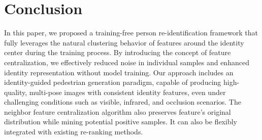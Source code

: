 \section{Conclusion}
In this paper, we proposed a training-free person re-identification framework that fully leverages the natural clustering behavior of features around the identity center during the training process. By introducing the concept of feature centralization, we effectively reduced noise in individual samples and enhanced identity representation without model training. Our approach includes an identity-guided pedestrian generation paradigm, capable of producing high-quality, multi-pose images with consistent identity features, even under challenging conditions such as visible, infrared, and occlusion scenarios. The neighbor feature centralization algorithm also preserves feature's original distribution while mining potential positive samples. It can also be flexibly integrated with existing re-ranking methods.